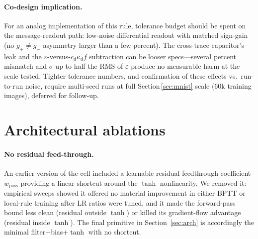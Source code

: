 \documentclass[11pt]{article}
\begin{document}
\paragraph{Co-design implication.}
For an analog implementation of this rule, tolerance budget should be
spent on the message-readout path: low-noise differential readout with
matched sign-gain (no $g_+\!\neq\!g_-$ asymmetry larger than a few
percent).  The cross-trace capacitor's leak and the
$\varepsilon$-versus-$c_d\kappa_d f$ subtraction can be looser
specs---several percent mismatch and $\sigma$ up to half the RMS of
$\varepsilon$ produce no measurable harm at the scale tested.  Tighter
tolerance numbers, and confirmation of these effects vs.\ run-to-run
noise, require multi-seed runs at full Section\,\ref{sec:mnist} scale
(60k training images), deferred for follow-up.

\appendix

\section{Architectural ablations}
\label{app:ablations}

\paragraph{No residual feed-through.}
An earlier version of the cell included a learnable residual-feedthrough
coefficient $w_{\text{pass}}$ providing a linear shortcut around the
$\tanh$ nonlinearity. We removed it: empirical sweeps showed it offered
no material improvement in either BPTT or local-rule training after LR
ratios were tuned, and it made the forward-pass bound less clean
(residual outside $\tanh$) or killed its gradient-flow advantage
(residual inside $\tanh$). The final primitive in Section~\ref{sec:arch}
is accordingly the minimal filter+bias+$\tanh$ with no shortcut.
\end{document}
